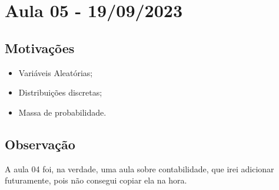\documentclass{article}
\begin{document}
\newpage

\section{Aula 05 - 19/09/2023}
\subsection{Motivações}
\begin{itemize}
  \item Variáveis Aleatórias;
  \item Distribuições discretas;
  \item Massa de probabilidade.
\end{itemize}
\subsection{Observação}
A aula 04 foi, na verdade, uma aula sobre contabilidade, que irei adicionar futuramente, pois não consegui copiar ela na hora.
\end{document}
